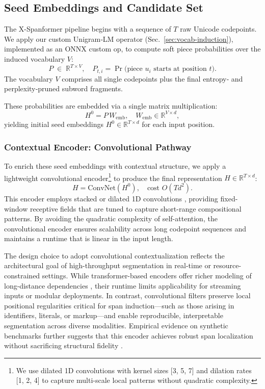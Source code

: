 \subsection{Seed Embeddings and Candidate Set}
\label{sec:seed-embeddings}

The X-Spanformer pipeline begins with a sequence of \(T\) raw Unicode codepoints. We apply our custom Unigram‐LM operator (Sec.~\ref{sec:vocab-induction}), implemented as an ONNX custom op, to compute soft piece probabilities over the induced vocabulary \(V\):
\[
P \;\in\;\mathbb{R}^{T\times V},
\quad
P_{t,i} = \Pr\bigl(\text{piece }u_i\text{ starts at position }t\bigr).
\]
The vocabulary \(V\) comprises all single codepoints plus the final entropy‐ and perplexity‐pruned subword fragments.

These probabilities are embedded via a single matrix multiplication:
\[
H^0 = P\,W_{\mathrm{emb}},
\quad
W_{\mathrm{emb}}\in\mathbb{R}^{V\times d},
\]
yielding initial seed embeddings \(H^0\in\mathbb{R}^{T\times d}\) for each input position.

\subsubsection{Contextual Encoder: Convolutional Pathway}

To enrich these seed embeddings with contextual structure, we apply a lightweight convolutional encoder\footnote{We use dilated 1D convolutions with kernel sizes [3, 5, 7] and dilation rates [1, 2, 4] to capture multi-scale local patterns without quadratic complexity.} to produce the final representation \(H\in\mathbb{R}^{T\times d}\):
\[
H = \mathrm{ConvNet}(H^0),\quad \text{cost }O(T d^2).
\]
This encoder employs stacked or dilated 1D convolutions \cite{tay2021charformer}, providing fixed-window receptive fields that are tuned to capture short-range compositional patterns. By avoiding the quadratic complexity of self-attention, the convolutional encoder ensures scalability across long codepoint sequences and maintains a runtime that is linear in the input length.

The design choice to adopt convolutional contextualization reflects the architectural goal of high-throughput segmentation in real-time or resource-constrained settings. While transformer-based encoders offer richer modeling of long-distance dependencies \cite{vaswani2017attention}, their runtime limits applicability for streaming inputs or modular deployments. In contrast, convolutional filters preserve local positional regularities critical for span induction—such as those arising in identifiers, literals, or markup—and enable reproducible, interpretable segmentation across diverse modalities. Empirical evidence on synthetic benchmarks further suggests that this encoder achieves robust span localization without sacrificing structural fidelity \cite{rawson2025streammix}.

